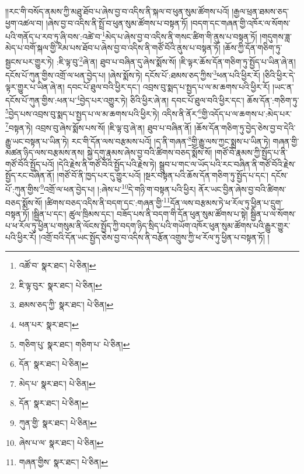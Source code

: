 །།རང་གི་བསོད་ནམས་ཀྱི་མཐུ་ཐོབ་པ་ཞེས་བྱ་བ་འདིས་ནི་སྐལ་བ་ཕུན་སུམ་ཚོགས་པའོ། །རྒྱལ་ཕྲན་ཐམས་ཅད་ཕྱག་འཚལ་བ། །ཞེས་བྱ་བ་འདིས་ནི་སྤྲོ་བ་ཕུན་སུམ་ཚོགས་པ་བསྟན་ཏོ། །བདག་དང་གཞན་གྱི་འཁོར་ལ་སོགས་པའི་གནོད་པ་རབ་ཏུ་ཞི་བས་:འཚེ་བ་\footnote{འཚོ་བ་  སྣར་ཐང་།  པེ་ཅིན། }མེད་པ་ཞེས་བྱ་བ་འདིས་ནི་གསང་ཚིག་གི་ནུས་པ་བསྟན་ཏོ། །གདུགས་ཟླ་མེད་པ་བགོ་སྐལ་གྱི་རིམ་པས་ཐོབ་པ་ཞེས་བྱ་བ་འདིས་ནི་གཙོ་བོའི་ནུས་པ་བསྟན་ཏོ། །ཆོས་ཀྱི་དོན་གཅིག་ཏུ་སྦྱངས་པར་གྱུར་ཏེ། :ཇི་ལྟ་བུ་\footnote{ཇི་ལྟ་བུར་  སྣར་ཐང་།  པེ་ཅིན། }ཞེ་ན། ཐུབ་པ་བཞིན་དུ་ཞེས་སྨོས་སོ། །ཇི་ལྟར་ཆོས་དོན་གཅིག་ཏུ་སྤྱོད་པ་ཡིན་ཞེ་ན། དངོས་པོ་ཀུན་གྱིས་འགྲོ་ལ་ཕན་བྱེད་པ། །ཞེས་སྨོས་ཏེ། དངོས་པོ་:ཐམས་ཅད་ཀྱིས་\footnote{ཐམས་ཅད་ཀྱི་  སྣར་ཐང་།  པེ་ཅིན། }ཕན་པའི་ཕྱིར་རོ། །ཅིའི་ཕྱིར་དེ་ལྟར་གྱུར་པ་ཡིན་ཞེ་ན། དབང་པོ་ཐུལ་བའི་ཕྱིར་དང་། འབྲས་བུ་སྨད་པ་སྤྱད་པ་ལ་མ་ཆགས་པའི་ཕྱིར་རོ། །ཡང་ན་དངོས་པོ་ཀུན་གྱིས་:ཕན་པ་\footnote{ཕན་པར་  སྣར་ཐང་། }བྱེད་པར་འགྱུར་ཏེ། ཅིའི་ཕྱིར་ཞེ་ན། དབང་པོ་ཐུལ་བའི་ཕྱིར་དང་། ཆོས་དོན་:གཅིག་ཏུ་\footnote{གཅིག་པུ་  སྣར་ཐང་། གཅིག་པ་  པེ་ཅིན། }བྱེད་པས་འབྲས་བུ་སྨད་པ་སྤྱད་པ་ལ་མ་ཆགས་པའི་ཕྱིར་ཏེ། འདིས་ནི་ནོར་\footnote{དོན་  སྣར་ཐང་།  པེ་ཅིན། }གྱི་འདོད་པ་ལ་ཆགས་པ་:མེད་པར་\footnote{མེད་པ་  སྣར་ཐང་།  པེ་ཅིན། }བསྟན་ཏེ། འབྲས་བུ་ཞེས་སྨོས་པས་སོ། །ཇི་ལྟ་བུ་ཞེ་ན། ཐུབ་པ་བཞིན་ནོ། །ཆོས་དོན་གཅིག་ཏུ་བྱེད་ཅེས་བྱ་བ་དེའི་རྒྱུ་ཡང་བསྟན་པ་ཡིན་ཏེ། རང་གི་དོན་ལས་བརྩམས་པའོ། །ད་ནི་གཞན་\footnote{དོན་  སྣར་ཐང་།  པེ་ཅིན། }གྱི་རྒྱུ་ལས་ཀྱང་སྨྲས་པ་ཡིན་ཏེ། གཞན་གྱི་མཚན་ཉིད་ལས་བརྩམས་ནས། སྐྱེ་དགུ་རྣམས་ཞེས་བྱ་བའི་ཚིགས་བཅད་སྨོས་སོ། །གཙོ་བོ་རྣམས་ཀྱི་སྤྱོད་པ་ནི་གཙོ་བོའི་སྤྱོད་པའོ། །དེའི་རྗེས་ནི་གཙོ་བོའི་སྤྱོད་པའི་རྗེས་ཏེ། སྒྲུབ་པ་གང་ལ་ཡོད་པའི་རང་བཞིན་ནི་གཙོ་བོའི་རྗེས་སྤྱོད་རང་བཞིན་ནོ། །གཙོ་བོ་ནི་ཁྱད་པར་དུ་གྱུར་པའོ། །སྔར་བསྟན་པའི་ཆོས་དོན་གཅིག་ཏུ་སྤྱོད་པ་དང་། དངོས་པོ་:ཀུན་གྱིས་\footnote{ཀུན་གྱི་  སྣར་ཐང་།  པེ་ཅིན། }འགྲོ་ལ་ཕན་བྱེད་པ། །:ཞེས་པ་\footnote{ཞེས་པ་ལ་  སྣར་ཐང་།  པེ་ཅིན། }དེ་གཉི་ག་བསྟན་པའི་ཕྱིར། ནོར་ཡང་བྱིན་ཞེས་བྱ་བའི་ཚིགས་བཅད་སྨོས་སོ། །ཚིགས་བཅད་འདིས་ནི་བདག་དང་:གཞན་གྱི་\footnote{གཞན་གྱིས་  སྣར་ཐང་།  པེ་ཅིན། }དོན་ལས་བརྩམས་ཏེ་ཕ་རོལ་ཏུ་ཕྱིན་པ་དྲུག་བསྟན་ཏོ། །སྦྱིན་པ་དང་། ཚུལ་ཁྲིམས་དང་། བཟོད་པས་ནི་བདག་གི་དོན་ཕུན་སུམ་ཚོགས་པ་སྟེ། སྦྱིན་པ་ལ་སོགས་པ་ཕ་རོལ་ཏུ་ཕྱིན་པ་གསུམ་ནི་ལོངས་སྤྱོད་ཀྱི་བདག་ཉིད་སྲིད་པའི་གཡོག་འཁོར་ཕུན་སུམ་ཚོགས་པའི་རྒྱུར་གྱུར་པའི་ཕྱིར་རོ། །འགྲོ་བའི་དོན་ཡང་སྤྱོད་ཅེས་བྱ་བ་འདིས་ནི་བརྩོན་འགྲུས་ཀྱི་ཕ་རོལ་ཏུ་ཕྱིན་པ་བསྟན་ཏོ། །

